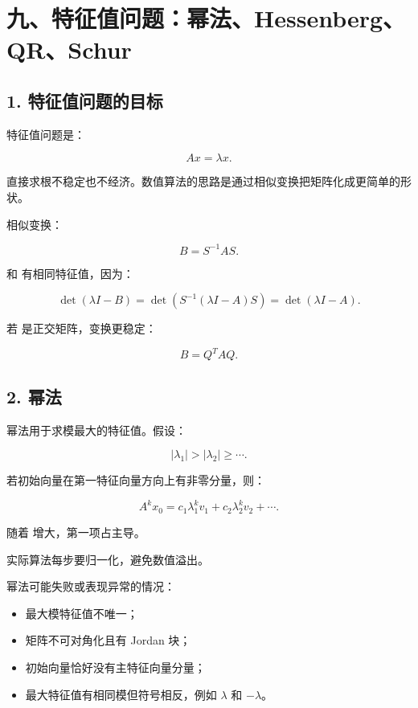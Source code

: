 \documentclass[11pt,a4paper]{ctexart}
\newcommand{\code}[1]{\begingroup\ttfamily\small #1\endgroup}
\begin{document}

\section*{九、特征值问题：幂法、Hessenberg、QR、Schur}



\subsection*{1. 特征值问题的目标}


特征值问题是：

\[
Ax=\lambda x.
\]

直接求根不稳定也不经济。数值算法的思路是通过相似变换把矩阵化成更简单的形状。

相似变换：

\[
B=S^{-1}AS.
\]

\code{} 和 \code{} 有相同特征值，因为：

\[
\det(\lambda I-B)=\det(S^{-1}(\lambda I-A)S)=\det(\lambda I-A).
\]

若 \code{} 是正交矩阵，变换更稳定：

\[
B=Q^TAQ.
\]


\subsection*{2. 幂法}


幂法用于求模最大的特征值。假设：

\[
|\lambda_1|>|\lambda_2|\ge \cdots.
\]

若初始向量在第一特征向量方向上有非零分量，则：

\[
A^kx_0
=c_1\lambda_1^kv_1+c_2\lambda_2^kv_2+\cdots.
\]

随着 \code{} 增大，第一项占主导。

实际算法每步要归一化，避免数值溢出。

幂法可能失败或表现异常的情况：

\begin{itemize}

\item 最大模特征值不唯一；

\item 矩阵不可对角化且有 Jordan 块；

\item 初始向量恰好没有主特征向量分量；

\item 最大特征值有相同模但符号相反，例如 $\lambda$ 和 $-\lambda$。

\end{itemize}
\end{document}
